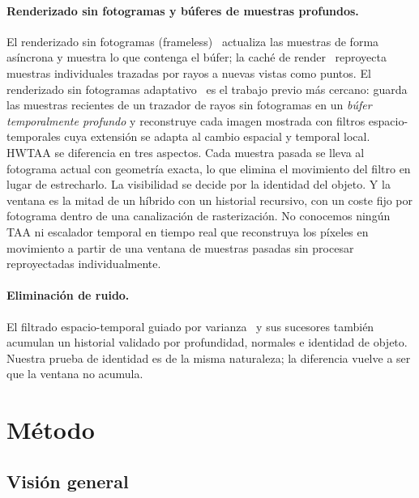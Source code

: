 \documentclass[11pt,a4paper]{article}
\begin{document}
\paragraph{Renderizado sin fotogramas y búferes de muestras profundos.} El renderizado sin fotogramas (frameless)~\cite{bishop1994frameless} actualiza las muestras de forma asíncrona y muestra lo que contenga el búfer; la caché de render~\cite{walter1999rendercache} reproyecta muestras individuales trazadas por rayos a nuevas vistas como puntos. El renderizado sin fotogramas adaptativo~\cite{dayal2005frameless} es el trabajo previo más cercano: guarda las muestras recientes de un trazador de rayos sin fotogramas en un \emph{búfer temporalmente profundo} y reconstruye cada imagen mostrada con filtros espacio-temporales cuya extensión se adapta al cambio espacial y temporal local. HWTAA se diferencia en tres aspectos. Cada muestra pasada se lleva al fotograma actual con geometría exacta, lo que elimina el movimiento del filtro en lugar de estrecharlo. La visibilidad se decide por la identidad del objeto. Y la ventana es la mitad de un híbrido con un historial recursivo, con un coste fijo por fotograma dentro de una canalización de rasterización. No conocemos ningún TAA ni escalador temporal en tiempo real que reconstruya los píxeles en movimiento a partir de una ventana de muestras pasadas sin procesar reproyectadas individualmente.

\paragraph{Eliminación de ruido.} El filtrado espacio-temporal guiado por varianza~\cite{schied2017svgf} y sus sucesores también acumulan un historial validado por profundidad, normales e identidad de objeto. Nuestra prueba de identidad es de la misma naturaleza; la diferencia vuelve a ser que la ventana no acumula.

\section{Método}
\label{sec:method}

\subsection{Visión general}
\label{sec:overview}
\end{document}
